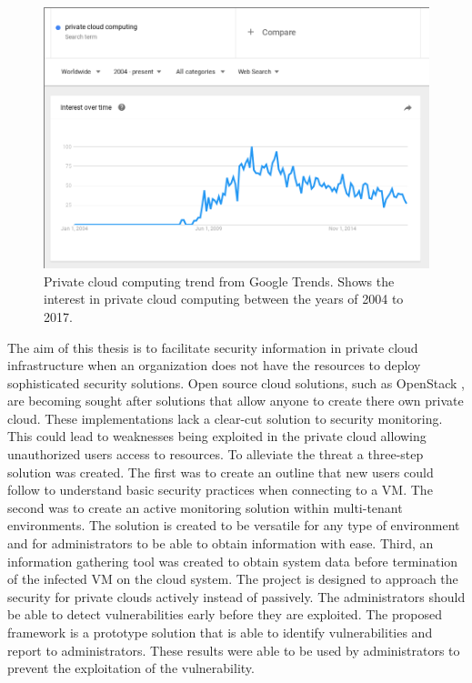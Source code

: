 \documentclass[12pt]{article}
\begin{document}
\begin{figure}[ht]
    \centering
    \includegraphics[scale=.3]{./pic/2017-06-14-135222_914x619_scrot.png}
    \caption{Private cloud computing trend from Google Trends. Shows the interest in private cloud computing between the years of 2004 to 2017. \cite{GoogleTrendsPriv}}
    \label{fig:PrivCloudTrendGoogle}
\end{figure}
\fi

The aim of this thesis is to facilitate security information in private cloud infrastructure when an organization does not have the resources to deploy sophisticated security solutions. Open source cloud solutions, such as OpenStack \cite{Openstack}, are becoming sought after solutions that allow anyone to create there own private cloud. These implementations lack a clear-cut solution to security monitoring. This could lead to weaknesses being exploited in the private cloud allowing unauthorized users access to resources. To alleviate the threat a three-step solution was created. The first was to create an outline that new users could follow to understand basic security practices when connecting to a VM. The second was to create an active monitoring solution within multi-tenant environments. The solution is created to be versatile for any type of environment and for administrators to be able to obtain information with ease. Third, an information gathering tool was created to obtain system data before termination of the infected VM on the cloud system. The project is designed to approach the security for private clouds actively instead of passively. The administrators should be able to detect vulnerabilities early before they are exploited. The proposed framework is a prototype solution that is able to identify vulnerabilities and report to administrators. These results were able to be used by administrators to prevent the exploitation of the vulnerability.
\end{document}
